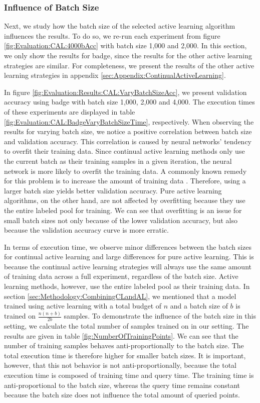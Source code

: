 \subsubsection{Influence of Batch Size}
\label{sec:Evaluation:Results:CAL:BatchSize}
Next, we study how the batch size of the selected active learning algorithm influences the results. To do so, we re-run each experiment from figure \ref{fig:Evaluation:CAL:4000bAcc}
with batch size 1,000 and 2,000. In this section, we only show the results for \gls{badge}, since the results for the other active learning strategies are similar. For completeness, we
present the results of the other active learning strategies in appendix \ref{sec:Appendix:ContinualActiveLearning}. \par
In figure \ref{fig:Evaluation:Results:CAL:VaryBatchSizeAcc}, we present validation accuracy using \gls{badge} with batch size 1,000, 2,000 and 4,000. The execution times of these experiments
are displayed in table \ref{fig:Evaluation:CAL:BadgeVaryBatchSizeTime}, respectively. When observing the results for varying batch size, we notice a positive correlation between batch size and
validation accuracy. This correlation is caused by neural networks' tendency to overfit their training data. Since continual active learning methods only use the current batch as their training
samples in a given iteration, the neural network is more likely to overfit the training data. A commonly known remedy for this problem is to increase the amount of training data
\cite{ying2019overview}. Therefore, using a larger batch size yields better validation accuracy. Pure active learning algorithms, on the other hand, are not affected by overfitting because
they use the entire labeled pool for training. We can see that overfitting is an issue for small batch sizes not only because of the lower validation accuracy, but also because the validation
accuracy curve is more erratic. \par
In terms of execution time, we observe minor differences between the batch sizes for continual active learning and large differences for pure active learning. This is because the continual
active learning strategies will always use the same amount of training data across a full experiment, regardless of the batch size. Active learning methods, however, use the entire labeled pool
as their training data. In section \ref{sec:Methodology:CombiningCLandAL}, we mentioned that a model trained using active learning with a total budget of $n$ and a batch size of $b$ is trained
on $\frac{n(n+b)}{2b}$ samples. To demonstrate the influence of the batch size in this setting, we calculate the total number of samples trained on in our setting. The results are given in table 
\ref{fig:NumberOfTrainingPoints}. We can see that the number of training samples behaves anti-proportionally to the batch size. The total execution time is therefore higher for smaller batch sizes.
It is important, however, that this not behavior is not anti-proportionally, because the total execution time is composed of training time and query time. The training time is anti-proportional
to the batch size, whereas the query time remains constant because the batch size does not influence the total amount of queried points. \par


